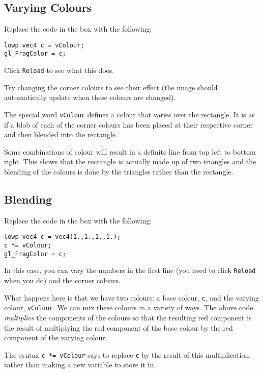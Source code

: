 \documentclass[
  html5,%
  mathml,%
  use filename%
]{internet}
\begin{document}
\subsection{Varying Colours}

Replace the code in the box with the following:

\begin{tcolorbox}
\begin{verbatim}
lowp vec4 c = vColour;
gl_FragColor = c;
\end{verbatim}
\end{tcolorbox}

Click \verb+Reload+ to see what this does.

Try changing the corner colours to see their effect (the image should automatically update when these colours are changed).

\begin{tcolorbox}
The special word \verb+vColour+ defines a colour that varies over the rectangle.
It is as if a blob of each of the corner colours has been placed at their respective corner and then blended into the rectangle.

Some combinations of colour will result in a definite line from top left to bottom right.
This shows that the rectangle is actually made up of two triangles and the blending of the colours is done by the triangles rather than the rectangle.  
\end{tcolorbox}

\subsection{Blending}

Replace the code in the box with the following:

\begin{tcolorbox}
\begin{verbatim}
lowp vec4 c = vec4(1.,1.,1.,1.);
c *= vColour;
gl_FragColor = c;
\end{verbatim}
\end{tcolorbox}

In this case, you can vary the numbers in the first line (you need to click \verb+Reload+ when you do) and the corner colours.

\begin{tcolorbox}
What happens here is that we have two colours: a base colour, \verb+c+, and the varying colour, \verb+vColour+.
We can mix these colours in a variety of ways.
The above code \emph{multiplies} the components of the colours so that the resulting red component is the result of multiplying the red component of the base colour by the red component of the varying colour.

The syntax \verb+c *= vColour+ says to replace \verb+c+ by the result of this multiplication rather than making a new variable to store it in.
\end{tcolorbox}
\end{document}

